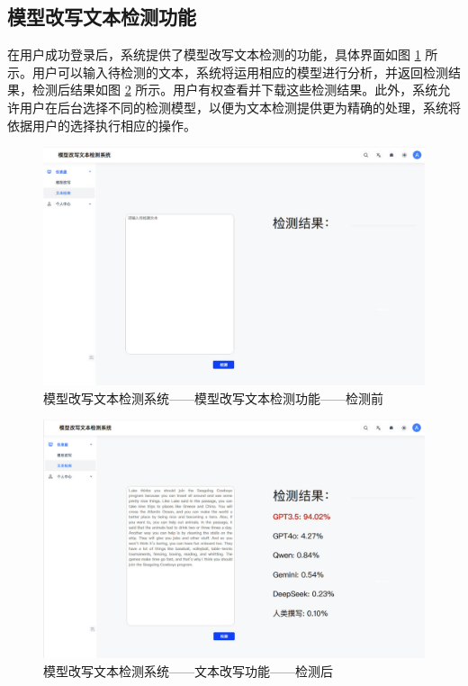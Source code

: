 \subsection{模型改写文本检测功能}

在用户成功登录后，系统提供了模型改写文本检测的功能，具体界面如图 \ref{fig:sys-detect} 所示。用户可以输入待检测的文本，系统将运用相应的模型进行分析，并返回检测结果，检测后结果如图 \ref{fig:sys-detect2} 所示。用户有权查看并下载这些检测结果。此外，系统允许用户在后台选择不同的检测模型，以便为文本检测提供更为精确的处理，系统将依据用户的选择执行相应的操作。

\begin{figure}[htb]
    \centering
    \includegraphics[width=\textwidth]{figures/sys-detect.jpg}
    \caption{模型改写文本检测系统——模型改写文本检测功能——检测前}
    \label{fig:sys-detect}
\end{figure}

\begin{figure}[htb]
    \centering
    \includegraphics[width=\textwidth]{figures/sys-detect2.jpg}
    \caption{模型改写文本检测系统——文本改写功能——检测后}
    \label{fig:sys-detect2}
\end{figure}

